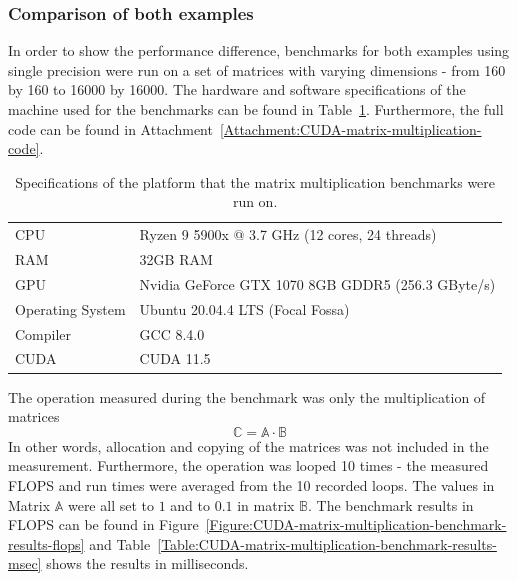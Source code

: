 \subsubsection{Comparison of both examples \TO}\label{Subsubsection:matrix-multiplication-comparison-of-examples}
In order to show the performance difference, benchmarks for both examples using single precision were run on a set of matrices with varying dimensions - from 160 by 160 to 16000 by 16000. The hardware and software specifications of the machine used for the benchmarks can be found in Table~\ref{Table:CUDA-matrix-multiplication-benchmark-system}. Furthermore, the full code can be found in Attachment~\ref{Attachment:CUDA-matrix-multiplication-code}.

\begin{table}[h]
	\centering
	\begin{tabular}{|l|l|}
		\hline
		CPU              & Ryzen 9 5900x @ 3.7 GHz (12 cores, 24 threads) \\
		RAM              & 32GB RAM \\
		GPU              & Nvidia GeForce GTX 1070 8GB GDDR5 (256.3 GByte/s)\\
		Operating System & Ubuntu 20.04.4 LTS (Focal Fossa) \\
		Compiler         & GCC 8.4.0 \\
		CUDA             & CUDA 11.5 \\ \hline
	\end{tabular}
	\caption{Specifications of the platform that the matrix multiplication benchmarks were run on.}
	\label{Table:CUDA-matrix-multiplication-benchmark-system}
\end{table}

The operation measured during the benchmark was only the multiplication of matrices
$$ \mathbb{C} = \mathbb{A} \cdot \mathbb{B} $$
In other words, allocation and copying of the matrices was not included in the measurement. Furthermore, the operation was looped 10 times - the measured FLOPS and run times were averaged from the 10 recorded loops. The values in Matrix $ \mathbb{A} $ were all set to $ 1 $ and to $ 0.1 $ in matrix $ \mathbb{B} $. The benchmark results in FLOPS can be found in Figure~\ref{Figure:CUDA-matrix-multiplication-benchmark-results-flops} and Table~\ref{Table:CUDA-matrix-multiplication-benchmark-results-msec} shows the results in milliseconds.

